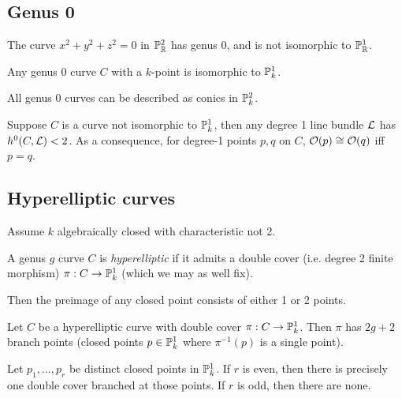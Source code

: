 \documentclass[11pt]{amsart}
\begin{document}
\subsection{Genus 0}

\begin{exm}
The curve $x^2+y^2+z^2 = 0$ in $\mathbb{P}^2_{\mathbb{R}}$ has genus 0, and is not isomorphic to $\mathbb{P}^1_{\mathbb{R}}$.
\end{exm}

\begin{prop}
Any genus 0 curve $C$ with a $k$-point is isomorphic to $\mathbb{P}^1_k$.
\end{prop}

\begin{prop}
All genus 0 curves can be described as conics in $\mathbb{P}^2_k$.
\end{prop}


\begin{prop}
\label{deg1LineBundleGlobalSections}
Suppose $C$ is a curve not isomorphic to $\mathbb{P}^1_k$, then any degree 1 line bundle $\mathcal{L}$ has $h^0(C, \mathcal{L}) < 2$. As a consequence, for degree-1 points $p,q$ on $C$, $\mathcal{O}(p) \cong \mathcal{O}(q)$ iff $p = q$.
\end{prop}

\subsection{Hyperelliptic curves}

Assume $k$ algebraically closed with characteristic not 2. 

\begin{defn}
A genus $g$ curve $C$ is \emph{hyperelliptic} if it admits a double cover (i.e. degree 2 finite morphism) $\pi: C\to \mathbb{P}^1_k$ (which we may as well fix).
\end{defn}

Then the preimage of any closed point consists of either 1 or 2 points.

\begin{thm}
Let $C$ be a hyperelliptic curve with double cover $\pi: C\to \mathbb{P}_k^1$. Then $\pi$ has $2g+2$ branch points (closed points $p\in \mathbb{P}_k^1$ where $\pi^{-1}(p)$ is a single point).
\end{thm}


\begin{prop}
Let $p_1,\dots,p_r$ be distinct closed points in $\mathbb{P}^1_k$. If $r$ is even, then there is precisely one double cover branched at those points. If $r$ is odd, then there are none.
\end{prop}
\end{document}

